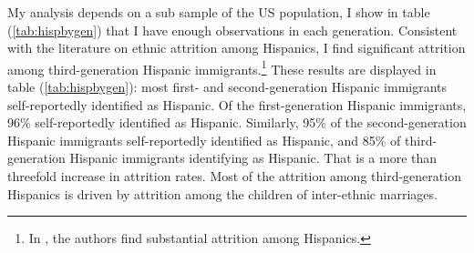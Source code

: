 \documentclass[12pt,english]{article}
\begin{document}
My analysis depends on a sub sample of the US population, I show in table (\ref{tab:hispbygen}) that I have enough observations in each generation. Consistent with the literature on ethnic attrition among Hispanics, I find significant attrition among third-generation Hispanic immigrants.\footnote{In \textcite{duncanIdentifyingLaterGenerationDescendants2018,duncanSocioeconomicIntegrationImmigrant2018, antmanEthnicAttritionObserved2016,antmanEthnicAttritionAssimilation2020}, the authors find substantial attrition among Hispanics.} These results are displayed in table (\ref{tab:hispbygen}): most first- and second-generation Hispanic immigrants self-reportedly identified as Hispanic. Of the first-generation Hispanic immigrants, 96\% self-reportedly identified as Hispanic. Similarly, 95\% of the second-generation Hispanic immigrants self-reportedly identified as Hispanic, and 85\% of third-generation Hispanic immigrants identifying as Hispanic. That is a more than threefold increase in attrition rates. Most of the attrition among third-generation Hispanics is driven by attrition among the children of inter-ethnic marriages.



\end{document}
